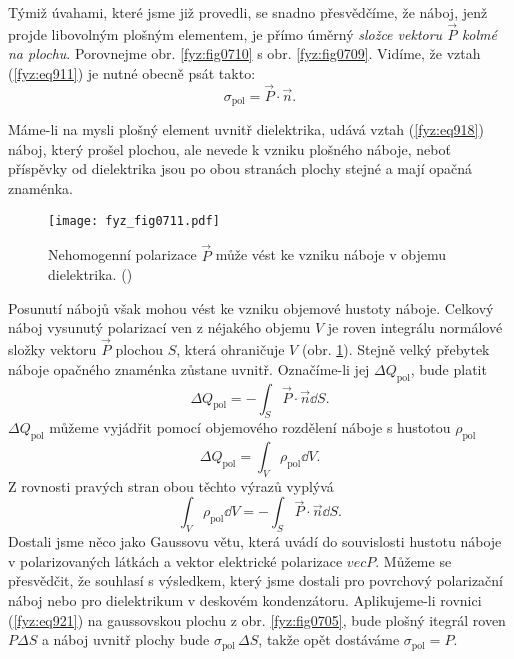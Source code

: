     Týmiž úvahami, které jsme již provedli, se snadno přesvědčíme, že náboj, jenž projde libovolným
    plošným elementem, je přímo úměrný \emph{složce vektoru \(\vec{P}\) kolmé na plochu}. Porovnejme
    obr. \ref{fyz:fig0710} s obr. \ref{fyz:fig0709}. Vidíme, že vztah (\ref{fyz:eq911}) je nutné
    obecně psát takto:
    \begin{equation}\label{fyz:eq918}
      σ_{\text{pol}}=\vec{P}\cdot\vec{n}.
    \end{equation}

    Máme-li na mysli plošný element uvnitř dielektrika, udává vztah (\ref{fyz:eq918}) náboj, který
    prošel plochou, ale nevede k vzniku plošného náboje, neboť příspěvky od dielektrika jsou po obou
    stranách plochy stejné a mají opačná znaménka.

    \begin{figure}[ht!] %
      \centering
      \texttt{[image: fyz\_fig0711.pdf]}
      \caption{Nehomogenní polarizace \(\vec{P}\) může vést ke vzniku náboje v objemu dielektrika.
               (\cite[s.~707]{Feynman02})}
      \label{fyz:fig0711}
    \end{figure}

    Posunutí nábojů však mohou vést ke vzniku objemové hustoty náboje. Celkový náboj vysunutý
    polarizací ven z néjakého objemu \(V\) je roven integrálu normálové složky vektoru \(\vec{P}\)
    plochou \(S\), která ohraničuje \(V\) (obr. \ref{fyz:fig0711}). Stejně velký přebytek náboje
    opačného znaménka zůstane uvnitř. Označíme-li jej \(ΔQ_{\text{pol}}\), bude platit
    \begin{equation}\label{fyz:eq919}
      \Delta Q_{\text{pol}}=-\int_S\vec{P}\cdot\vec{n}\dd{S}.
    \end{equation}
    \(\Delta Q_{\text{pol}}\) můžeme vyjádřit pomocí objemového rozdělení náboje s hustotou
    \(ρ_{\text{pol}}\)
    \begin{equation}\label{fyz:eq920}
      \Delta Q_{\text{pol}}=\int_V\rho_{\text{pol}}\dd{V}.
    \end{equation}
    Z rovnosti pravých stran obou těchto výrazů vyplývá
    \begin{equation}\label{fyz:eq921}
      \int_V\rho_{\text{pol}}\dd{V}=-\int_S\vec{P}\cdot\vec{n}\dd{S}.
    \end{equation}
    Dostali jsme něco jako Gaussovu větu, která uvádí do souvislosti hustotu náboje v polarizovaných
    látkách a vektor elektrické polarizace \(vec{P}\). Můžeme se přesvědčit, že souhlasí s
    výsledkem, který jsme dostali pro povrchový polarizační náboj nebo pro dielektrikum v deskovém
    kondenzátoru. Aplikujeme-li rovnici (\ref{fyz:eq921}) na gaussovskou plochu z obr.
    \ref{fyz:fig0705}, bude plošný itegrál roven \(PΔS\) a náboj uvnitř plochy bude
    \(\sigma_{\text{pol}}\,\Delta S\), takže opět dostáváme \(σ_{\text{pol}}=P\).
    
